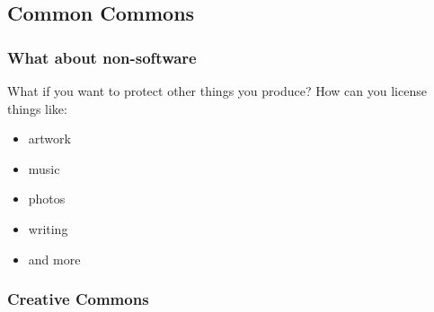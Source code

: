 \documentclass{beamer}
\begin{document}
	\subsection{Common Commons}
	\begin{frame}
		\frametitle{What about non-software}
		What if you want to protect other things you produce? How can you license things like:
		\pause
		\begin{itemize}[<+->]
			\item artwork
			\item music
			\item photos
			\item writing
			\item and more
		\end{itemize}
	\end{frame}
	\begin{frame}
		\frametitle{Creative Commons}
		
	\end{frame}
\end{document}
